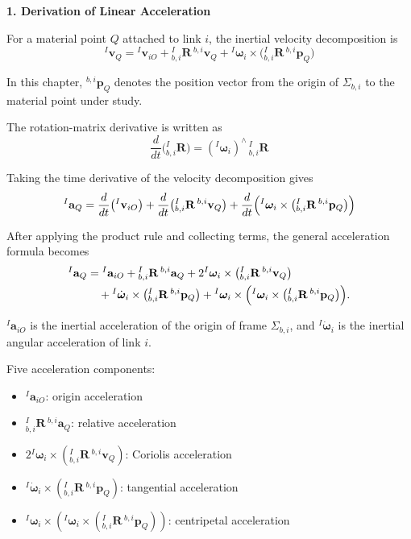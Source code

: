 \documentclass[12pt,a4paper]{report}
\newcommand{\newsymbols}[1]{\par\noindent{}#1\par\vspace{0.35em}}
\newcommand{\vect}[1]{\mathbf{#1}}
\newcommand{\Frame}[1]{\Sigma_{#1}}
\newcommand{\Rot}[2]{{}_{#1}^{#2}\mathbf{R}}
\newcommand{\skewmat}[1]{\left(#1\right)^\wedge}
\newcommand{\angvel}{\boldsymbol{\omega}}
\begin{document}
\textbf{1. Derivation of Linear Acceleration}

For a material point $Q$ attached to link $i$, the inertial velocity decomposition is
\begin{equation}
{}^{I}\vect{v}_{Q}
=
{}^{I}\vect{v}_{iO}
+
\Rot{b,i}{I}\,{}^{b,i}\vect{v}_{Q}
+
{}^{I}\angvel_{i} \times \bigl(\Rot{b,i}{I}\,{}^{b,i}\vect{p}_{Q}\bigr)
\end{equation}
\newsymbols{In this chapter, ${}^{b,i}\vect{p}_{Q}$ denotes the position vector from the origin of $\Frame{b,i}$ to the material point under study.}

The rotation-matrix derivative is written as
\begin{equation}
\frac{d}{dt}\bigl(\Rot{b,i}{I}\bigr)
=
\skewmat{{}^{I}\angvel_{i}}\,\Rot{b,i}{I}
\end{equation}

Taking the time derivative of the velocity decomposition gives
\begin{equation}
{}^{I}\vect{a}_{Q}
=
\frac{d}{dt}\bigl({}^{I}\vect{v}_{iO}\bigr)
+
\frac{d}{dt}\bigl(\Rot{b,i}{I}\,{}^{b,i}\vect{v}_{Q}\bigr)
+
\frac{d}{dt}\Bigl({}^{I}\angvel_{i} \times \bigl(\Rot{b,i}{I}\,{}^{b,i}\vect{p}_{Q}\bigr)\Bigr)
\end{equation}

After applying the product rule and collecting terms, the general acceleration formula becomes
\begin{equation}
\begin{aligned}
{}^{I}\vect{a}_{Q}
&=
{}^{I}\vect{a}_{iO}
+
\Rot{b,i}{I}\,{}^{b,i}\vect{a}_{Q}
+
2{}^{I}\angvel_{i} \times \bigl(\Rot{b,i}{I}\,{}^{b,i}\vect{v}_{Q}\bigr) \\
&\quad
+
{}^{I}\dot{\angvel}_{i} \times \bigl(\Rot{b,i}{I}\,{}^{b,i}\vect{p}_{Q}\bigr)
+
{}^{I}\angvel_{i} \times
\Bigl({}^{I}\angvel_{i} \times \bigl(\Rot{b,i}{I}\,{}^{b,i}\vect{p}_{Q}\bigr)\Bigr).
\end{aligned}
\end{equation}
\newsymbols{${}^{I}\vect{a}_{iO}$ is the inertial acceleration of the origin of frame $\Frame{b,i}$, and ${}^{I}\dot{\angvel}_{i}$ is the inertial angular acceleration of link $i$.}

Five acceleration components:
\begin{itemize}
\item ${}^{I}\vect{a}_{iO}$: origin acceleration
\item $\Rot{b,i}{I}\,{}^{b,i}\vect{a}_{Q}$: relative acceleration
\item $2{}^{I}\angvel_{i} \times (\Rot{b,i}{I}\,{}^{b,i}\vect{v}_{Q})$: Coriolis acceleration
\item ${}^{I}\dot{\angvel}_{i} \times (\Rot{b,i}{I}\,{}^{b,i}\vect{p}_{Q})$: tangential acceleration
\item ${}^{I}\angvel_{i} \times ({}^{I}\angvel_{i} \times (\Rot{b,i}{I}\,{}^{b,i}\vect{p}_{Q}))$: centripetal acceleration
\end{itemize}
\end{document}
